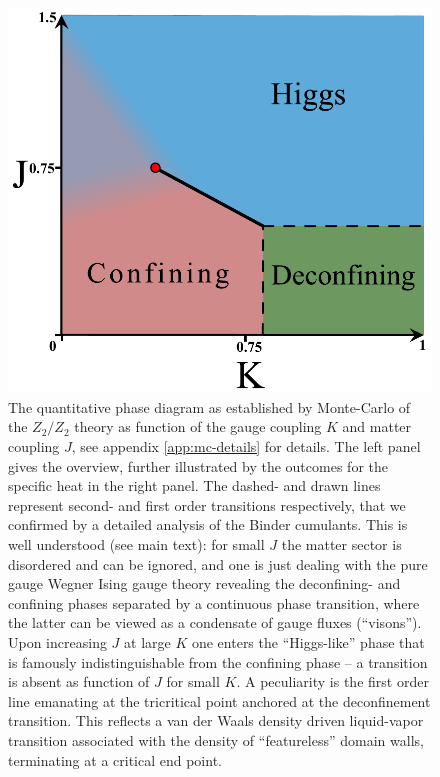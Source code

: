 \begin{figure}[!h]
	\centering	\includegraphics[width=.42\textwidth]{figures/chapter2/Z2Z2phasedia.pdf}%
	\caption{The quantitative phase diagram as established by Monte-Carlo of the $Z_2 / Z_2$ theory as function of the gauge coupling $K$ and matter coupling $J$, see appendix \ref{app:mc-details} for details. The left panel gives the overview, further illustrated by  the outcomes for the specific heat in the right panel. The dashed- and drawn lines represent second- and first order transitions respectively, that we confirmed by a detailed analysis of the Binder cumulants. This is well understood (see main text): for small $J$ the matter sector is disordered and can be ignored, and one is just dealing with the pure gauge Wegner Ising gauge theory revealing the deconfining- and confining phases separated by a continuous phase transition, where the latter can be viewed as a condensate of gauge fluxes (``visons''). Upon increasing $J$ at  large $K$ one enters the ``Higgs-like'' phase that is famously indistinguishable from the confining phase -- a transition is absent as function of $J$ for small $K$. A peculiarity is the first order line emanating at the tricritical point anchored at the deconfinement transition. This reflects a van der Waals density driven liquid-vapor transition associated with the density of ``featureless'' domain walls, terminating at a critical end point.}
	\label{Z2Z2phasediagram}
\end{figure}

